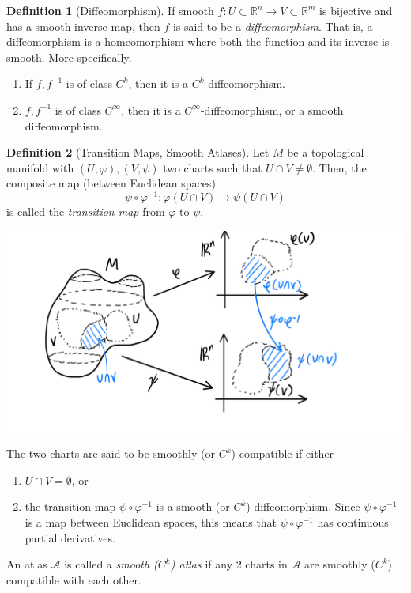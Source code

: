 \documentclass{article}
\theoremstyle{remark}
\theoremstyle{definition}
\newtheorem{definition}{Definition}[section]
\begin{document}
    \begin{definition}[Diffeomorphism]
      If smooth $f: U \subset \mathbb{R}^n \longrightarrow V \subset \mathbb{R}^m$ is bijective and has a smooth inverse map, then $f$ is said to be a \textit{diffeomorphism}. That is, a diffeomorphism is a homeomorphism where both the function and its inverse is smooth. More specifically, 
      \begin{enumerate}
        \item If $f, f^{-1}$ is of class $C^k$, then it is a $C^k$-diffeomorphism. 
        \item $f, f^{-1}$ is of class $C^\infty$, then it is a $C^\infty$-diffeomorphism, or a smooth diffeomorphism.
      \end{enumerate}
    \end{definition}

    \begin{definition}[Transition Maps, Smooth Atlases]
      Let $M$ be a topological manifold with $(U, \varphi), (V, \psi)$ two charts such that $U \cap V \neq \emptyset$. Then, the composite map (between Euclidean spaces)
      \[\psi \circ \varphi^{-1} : \varphi(U \cap V) \longrightarrow \psi(U \cap V)\]
      is called the \textit{transition map} from $\varphi$ to $\psi$. 
      \begin{center}
          \includegraphics[scale=0.27]{img/Transition_Map.PNG}
      \end{center}
      The two charts are said to be smoothly (or $C^k$) compatible if either 
      \begin{enumerate}
          \item $U \cap V = \emptyset$, or
          \item the transition map $\psi \circ \varphi^{-1}$ is a smooth (or $C^k$) diffeomorphism. Since $\psi \circ \varphi^{-1}$ is a map between Euclidean spaces, this means that $\psi \circ \varphi^{-1}$ has continuous partial derivatives. 
      \end{enumerate}
      An atlas $\mathcal{A}$ is called a \textit{smooth ($C^k$) atlas} if any 2 charts in $\mathcal{A}$ are smoothly ($C^k$) compatible with each other. 
    \end{definition}
\end{document}
